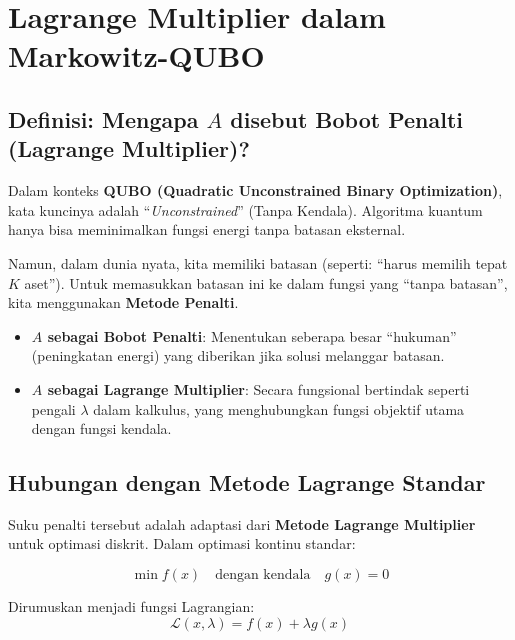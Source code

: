\section{Lagrange Multiplier dalam Markowitz-QUBO}\label{appendix-c}

\hypertarget{definisi-mengapa-a-disebut-bobot-penalti-lagrange-multiplier}{%
\subsection{\texorpdfstring{Definisi: Mengapa \(A\) disebut Bobot Penalti (Lagrange Multiplier)?}{Definisi: Mengapa A disebut Bobot Penalti (Lagrange Multiplier)?}}\label{definisi-mengapa-a-disebut-bobot-penalti-lagrange-multiplier}}

Dalam konteks \textbf{QUBO (Quadratic Unconstrained Binary Optimization)}, kata kuncinya adalah ``\emph{Unconstrained}'' (Tanpa Kendala). Algoritma kuantum hanya bisa meminimalkan fungsi energi tanpa batasan eksternal.

Namun, dalam dunia nyata, kita memiliki batasan (seperti: ``harus memilih tepat \(K\) aset''). Untuk memasukkan batasan ini ke dalam fungsi yang ``tanpa batasan'', kita menggunakan \textbf{Metode Penalti}.

\begin{itemize}
\tightlist
\item
  \textbf{\(A\) sebagai Bobot Penalti}: Menentukan seberapa besar ``hukuman'' (peningkatan energi) yang diberikan jika solusi melanggar batasan.
\item
  \textbf{\(A\) sebagai Lagrange Multiplier}: Secara fungsional bertindak seperti pengali \(\lambda\) dalam kalkulus, yang menghubungkan fungsi objektif utama dengan fungsi kendala.
\end{itemize}

\hypertarget{hubungan-dengan-metode-lagrange-standar}{%
\subsection{Hubungan dengan Metode Lagrange Standar}\label{hubungan-dengan-metode-lagrange-standar}}

Suku penalti tersebut adalah adaptasi dari \textbf{Metode Lagrange Multiplier} untuk optimasi diskrit. Dalam optimasi kontinu standar:

\[\min f(x) \quad \text{dengan kendala} \quad g(x) = 0\]

Dirumuskan menjadi fungsi Lagrangian: \[\mathcal{L}(x, \lambda) = f(x) + \lambda g(x)\]


